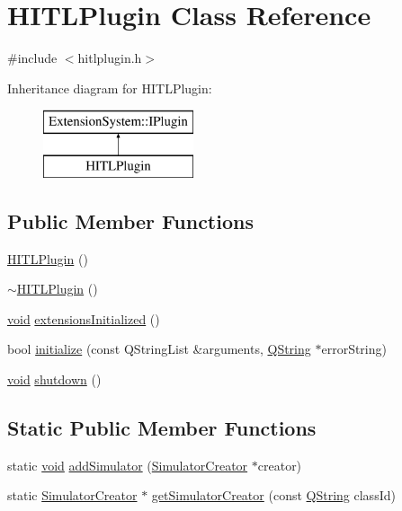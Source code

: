 \hypertarget{class_h_i_t_l_plugin}{\section{\-H\-I\-T\-L\-Plugin \-Class \-Reference}
\label{class_h_i_t_l_plugin}
}


{\ttfamily \#include $<$hitlplugin.\-h$>$}

\-Inheritance diagram for \-H\-I\-T\-L\-Plugin\-:\begin{figure}[H]
\begin{center}
\leavevmode
\includegraphics[height=2.000000cm]{class_h_i_t_l_plugin}
\end{center}
\end{figure}
\subsection*{\-Public \-Member \-Functions}
\begin{DoxyCompactItemize}
\item 
\hyperlink{group___h_i_t_l_plugin_ga0f1bfd313d4d0d404f51e34d8dbaacc5}{\-H\-I\-T\-L\-Plugin} ()
\item 
\hyperlink{group___h_i_t_l_plugin_ga371454242ad0b7e52024243ec91c7d13}{$\sim$\-H\-I\-T\-L\-Plugin} ()
\item 
\hyperlink{group___u_a_v_objects_plugin_ga444cf2ff3f0ecbe028adce838d373f5c}{void} \hyperlink{group___h_i_t_l_plugin_ga30d63de205d36f5e637e17ae3efb35cd}{extensions\-Initialized} ()
\item 
bool \hyperlink{group___h_i_t_l_plugin_ga113a69fc6f312ce4658d3c6266e3545f}{initialize} (const \-Q\-String\-List \&arguments, \hyperlink{group___u_a_v_objects_plugin_gab9d252f49c333c94a72f97ce3105a32d}{\-Q\-String} $\ast$error\-String)
\item 
\hyperlink{group___u_a_v_objects_plugin_ga444cf2ff3f0ecbe028adce838d373f5c}{void} \hyperlink{group___h_i_t_l_plugin_gadc35670ca57c30770f97bf6e95e9297b}{shutdown} ()
\end{DoxyCompactItemize}
\subsection*{\-Static \-Public \-Member \-Functions}
\begin{DoxyCompactItemize}
\item 
static \hyperlink{group___u_a_v_objects_plugin_ga444cf2ff3f0ecbe028adce838d373f5c}{void} \hyperlink{group___h_i_t_l_plugin_ga54ec8bdd017e6c77dc8f88009474d78e}{add\-Simulator} (\hyperlink{class_simulator_creator}{\-Simulator\-Creator} $\ast$creator)
\item 
static \hyperlink{class_simulator_creator}{\-Simulator\-Creator} $\ast$ \hyperlink{group___h_i_t_l_plugin_gad74c7b21a8be7419684135b3f0498b01}{get\-Simulator\-Creator} (const \hyperlink{group___u_a_v_objects_plugin_gab9d252f49c333c94a72f97ce3105a32d}{\-Q\-String} class\-Id)
\end{DoxyCompactItemize}
